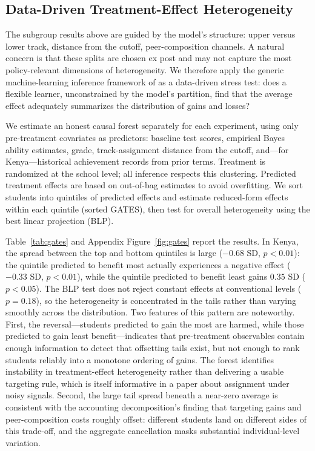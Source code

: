\documentclass[11pt]{article}
\begin{document}
\subsection{Data-Driven Treatment-Effect Heterogeneity}

The subgroup results above are guided by the model's structure: upper versus lower track, distance from the cutoff, peer-composition channels. A natural concern is that these splits are chosen ex post and may not capture the most policy-relevant dimensions of heterogeneity. We therefore apply the generic machine-learning inference framework of \cite{chernozhukov2025fisher} as a data-driven stress test: does a flexible learner, unconstrained by the model's partition, find that the average effect adequately summarizes the distribution of gains and losses?

We estimate an honest causal forest \citep{wager_estimation_2018} separately for each experiment, using only pre-treatment covariates as predictors: baseline test scores, empirical Bayes ability estimates, grade, track-assignment distance from the cutoff, and---for Kenya---historical achievement records from prior terms. Treatment is randomized at the school level; all inference respects this clustering. Predicted treatment effects are based on out-of-bag estimates to avoid overfitting. We sort students into quintiles of predicted effects and estimate reduced-form effects within each quintile (sorted GATES), then test for overall heterogeneity using the best linear projection (BLP).

Table~\ref{tab:gates} and Appendix Figure~\ref{fig:gates} report the results. In Kenya, the spread between the top and bottom quintiles is large ($-0.68$ SD, $p < 0.01$): the quintile predicted to benefit most actually experiences a negative effect ($-0.33$ SD, $p < 0.01$), while the quintile predicted to benefit least gains $0.35$ SD ($p < 0.05$). The BLP test does not reject constant effects at conventional levels ($p = 0.18$), so the heterogeneity is concentrated in the tails rather than varying smoothly across the distribution. Two features of this pattern are noteworthy. First, the reversal---students predicted to gain the most are harmed, while those predicted to gain least benefit---indicates that pre-treatment observables contain enough information to detect that offsetting tails exist, but not enough to rank students reliably into a monotone ordering of gains. The forest identifies instability in treatment-effect heterogeneity rather than delivering a usable targeting rule, which is itself informative in a paper about assignment under noisy signals. Second, the large tail spread beneath a near-zero average is consistent with the accounting decomposition's finding that targeting gains and peer-composition costs roughly offset: different students land on different sides of this trade-off, and the aggregate cancellation masks substantial individual-level variation.
\end{document}

